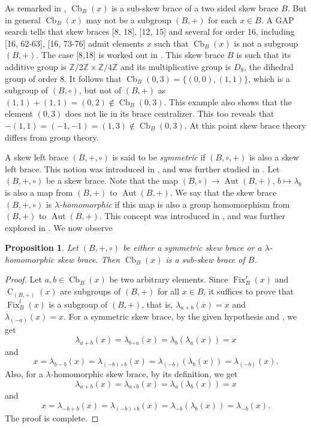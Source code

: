 \documentclass[oneside]{amsart}
\numberwithin{equation}{section}
\theoremstyle{plain}
\newtheorem{pro}[equation]{Proposition}
\theoremstyle{definition}
\newcommand{\C}{\operatorname{C} }
\newcommand{\Cb}{\operatorname{Cb} }
\newcommand{\Aut}{\operatorname{Aut} }
\newcommand{\Fix}{\operatorname{Fix} }
\begin{document}
As remarked in \cite[page 175]{CFT25},  $\Cb_{B}(x)$ is a sub-skew brace of a two sided skew brace $B$. But in general  $\Cb_{B}(x)$ may not be a subgroup $(B, +)$ for each $x \in B$. A GAP search tells that skew braces [8, 18], [12, 15] and several for order 16, including [16, 62-63], [16, 73-76] admit elements $x$ such that $\Cb_{B}(x)$ is not a subgroup $(B, +)$. The case [8,18] is worked out in \cite[Example 3.6]{CFT25}. This skew brace  $B$ is such that its additive group is $\mathbb{Z}/2\mathbb{Z} \times \mathbb{Z}/4\mathbb{Z}$ and its multiplicative group is $D_8$, the dihedral group of order 8. It follows that $\Cb_B(0,3) = \{(0, 0), (1, 1)\}$, which is a subgroup of $(B, \circ)$, but not of $(B, +)$ as $(1, 1) + (1, 1) = (0, 2) \not\in \Cb_B(0,3)$. This example also shows that the element $(0, 3)$ does not lie in its brace centralizer. This too reveals that  $- (1, 1) = (-1, -1) = (1, 3) \not\in \Cb_B(0,3)$. At this point skew brace theory differs from group theory. 
 

A skew left brace $(B, +, \circ)$ is said to be \emph{symmetric} if $(B, \circ, +)$ is also a skew left brace. This notion was introduced in \cite{LC19}, and was further studied in \cite{BNY23, AC20}.  Let $(B, +, \circ)$ be a skew brace. Note that the map $(B, \circ) \to \Aut(B, +)$, $b \mapsto \lambda_b$ is also a map from $(B, +)$ to $\Aut(B, +)$.  We say that the skew brace $(B, +, \circ)$ is \emph{$\lambda$-homomorphic} if this map is also a group homomorphism from $(B, +)$ to $\Aut(B, +)$.  This concept was introduced in \cite{CCD20}, and was further explored in \cite{BNY22}. We now observe

\begin{pro}
    Let $(B, +, \circ)$ be either a symmetric skew brace or a $\lambda$-homomorphic skew brace. Then $\Cb_{B}(x)$ is a sub-skew brace of $B$.
\end{pro}
\begin{proof}
    Let $a, b \in \Cb_{B}(x)$ be two arbitrary elements.   Since $\Fix^r_B(x)$ and $\C_{(B, +)}(x)$ are subgroups of $(B, +)$ for all $x \in B$, it suffices  to prove that  $\Fix^l_B(x)$ is a subgroup of $(B, +)$, that is,  $\lambda_{a + b} (x) = x$ and $\lambda_{(-a)}(x)=x$. For a symmetric skew brace, by the given hypothesis and \cite[Proposition 3.6.]{BNY23}, we get
    $$
        \lambda_{a + b} (x) = \lambda_{b \circ a} (x)=\lambda_b(\lambda_ a(x)) = x
    $$
    and
    $$
       x=\lambda_{b -b} (x)=\lambda_{(-b)\circ b} (x)=\lambda_{(-b)}(\lambda_ b (x))=\lambda_{(-b)}(x).
    $$   
  Also, for  a $\lambda$-homomorphic skew brace, by its definition, we get 
  $$
        \lambda_{a + b} (x) = \lambda_{a \circ b} (x)=\lambda_a(\lambda_ b(x)) = x
    $$
    and
    $$
        x=\lambda_{-b  + b} (x)=\lambda_{(-b)\circ b} (x)=\lambda_{-b}(\lambda_ b (x))=\lambda_{-b}(x).
    $$   
The proof is complete.
\end{proof}
\end{document}
